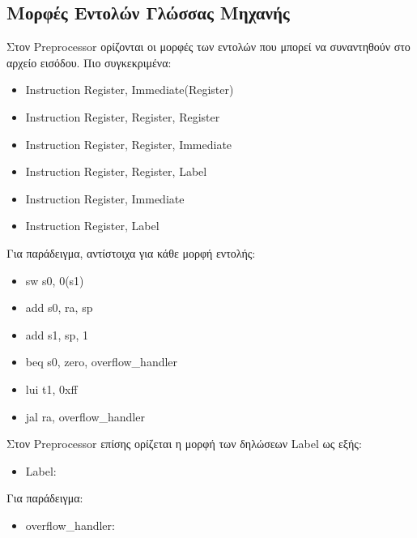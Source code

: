 \documentclass[11pt]{extarticle}
\begin{document}
\subsection{Μορφές Εντολών Γλώσσας Μηχανής}
Στον Preprocessor ορίζονται οι μορφές των εντολών που μπορεί να συναντηθούν στο αρχείο εισόδου.
Πιο συγκεκριμένα:
\begin{itemize}
\item Instruction Register, Immediate(Register)
\item Instruction Register, Register, Register
\item Instruction Register, Register, Immediate
\item Instruction Register, Register, Label
\item Instruction Register, Immediate
\item Instruction Register, Label
\end{itemize}
Για παράδειγμα, αντίστοιχα για κάθε μορφή εντολής:
\begin{itemize}
\item sw s0, 0(s1) 
\item add s0, ra, sp
\item add s1, sp, 1
\item beq s0, zero, overflow\_handler
\item lui t1, 0xff
\item jal ra, overflow\_handler
\end{itemize}
Στον Preprocessor επίσης ορίζεται η μορφή των δηλώσεων Label ως εξής:
\begin{itemize}
\item Label:
\end{itemize}
Για παράδειγμα:
\begin{itemize}
\item overflow\_handler:
\end{itemize}

\newpage
\end{document}
